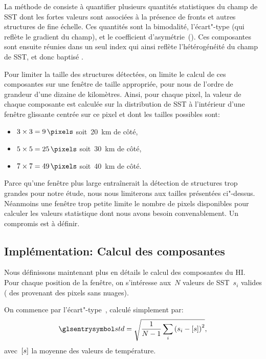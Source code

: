 La méthode de \textcite{liu_2016} consiste à quantifier plusieurs quantités statistiques du champ de SST dont les fortes valeurs sont associées à la présence de fronts et autres structures de fine échelle.
Ces quantités sont la bimodalité, l'écart"-type (qui reflète le gradient du champ), et le coefficient d'asymétrie~().
Ces composantes sont ensuite réunies dans un seul index qui ainsi reflète l'hétérogénéité du champ de SST, et donc baptisé .

Pour limiter la taille des structures détectées, on limite le calcul de ces composantes sur une fenêtre de taille appropriée,  pour nous de l'ordre de grandeur d'une dizaine de kilomètres.
Ainsi, pour chaque pixel, la valeur de chaque composante est calculée sur la distribution de SST à l'intérieur d'une fenêtre glissante centrée sur ce pixel et dont les tailles possibles sont:
\begin{itemize}
  \item \(3 \times 3 =\qty{9}{\pixels}\) soit~\tapprox\qty{20}{\km} de côté,
  \item \(5 \times 5 =\qty{25}{\pixels}\) soit~\tapprox\qty{30}{\km} de côté,
  \item \(7 \times 7 =\qty{49}{\pixels}\) soit~\tapprox\qty{40}{\km} de côté.
\end{itemize}
Parce qu'une fenêtre plus large entraînerait la détection de structures trop grandes pour notre étude, nous nous limiterons aux tailles présentées ci"-dessus.
Néanmoins une fenêtre trop petite limite le nombre de pixels disponibles pour calculer les valeurs statistique dont nous avons besoin convenablement.
Un compromis est à définir.

\subsection{Implémentation: Calcul des composantes}
\label{sec:calcul-composantes}

Nous définissons maintenant plus en détails le calcul des composantes du HI.
Pour chaque position de la fenêtre, on s'intéresse aux~\(N\) valeurs de SST~\(s_{i}\) valides ( des provenant des pixels sans nuages).

On commence par l'écart"-type~, calculé simplement par:
\begin{equation}
  \am{std} = \sqrt{\frac{1}{N-1} \sum_i \paren{s_i - \moy{s}}^2},
\end{equation}
avec~\(\left[s\right]\) la moyenne des valeurs de température.

